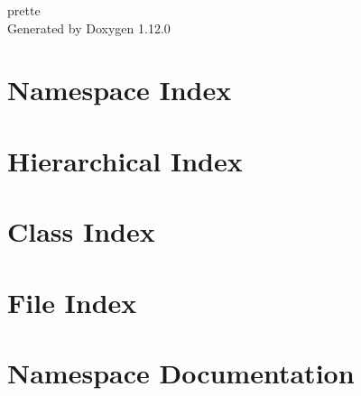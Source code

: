 \documentclass[twoside]{book}
\newcommand{\+}{\discretionary{\mbox{\scriptsize$\hookleftarrow$}}{}{}}
\newcommand{\clearemptydoublepage}{%
    \newpage{\pagestyle{empty}\cleardoublepage}%
  }
\begin{document}
  \raggedbottom
    \hypersetup{pageanchor=false,
                bookmarksnumbered=true,
                pdfencoding=unicode
               }
  \begin{titlepage}
  \vspace*{7cm}
  \begin{center}%
  {\Large prette}\\
  \vspace*{1cm}
  {\large Generated by Doxygen 1.12.0}\\
  \end{center}
  \end{titlepage}
  \clearemptydoublepage
  \tableofcontents
  \clearemptydoublepage
  \hypersetup{pageanchor=true}
\chapter{Namespace Index}

\chapter{Hierarchical Index}

\chapter{Class Index}

\chapter{File Index}

\chapter{Namespace Documentation}
























\end{document}
